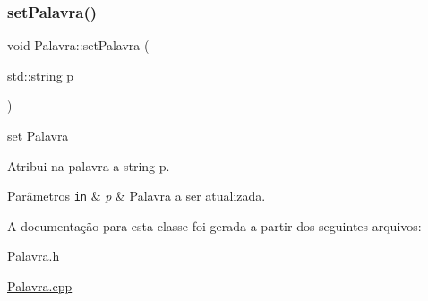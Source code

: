 \subsubsection{\texorpdfstring{set\+Palavra()}{setPalavra()}}
{\footnotesize\ttfamily void Palavra\+::set\+Palavra (\begin{DoxyParamCaption}\item[{std\+::string}]{p }\end{DoxyParamCaption})}



set \hyperlink{classPalavra}{Palavra} 

Atribui na palavra a string p. 
\begin{DoxyParams}[1]{Parâmetros}
\mbox{\tt in}  & {\em p} & \hyperlink{classPalavra}{Palavra} a ser atualizada. \\
\hline
\end{DoxyParams}


A documentação para esta classe foi gerada a partir dos seguintes arquivos\+:\begin{DoxyCompactItemize}
\item 
\hyperlink{Palavra_8h}{Palavra.\+h}\item 
\hyperlink{Palavra_8cpp}{Palavra.\+cpp}\end{DoxyCompactItemize}
